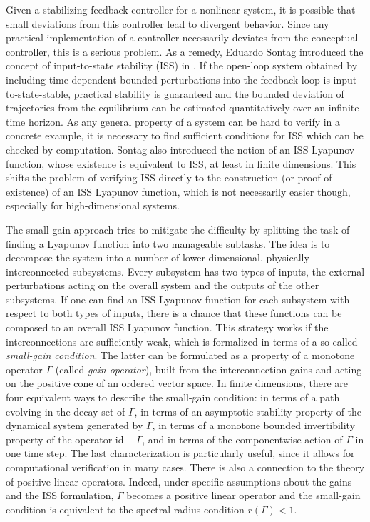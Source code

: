 \documentclass[10pt, oneside, a4paper]{article}
\newcommand{\id}{\mathrm{id}}
\begin{document}
Given a stabilizing feedback controller for a nonlinear system, it is possible that small deviations from this controller lead to divergent behavior. Since any practical implementation of a controller necessarily deviates from the conceptual controller, this is a serious problem. As a remedy, Eduardo Sontag introduced the concept of input-to-state stability (ISS) in \cite{Son}. If the open-loop system obtained by including time-dependent bounded perturbations into the feedback loop is input-to-state-stable, practical stability is guaranteed and the bounded deviation of trajectories from the equilibrium can be estimated quantitatively over an infinite time horizon. As any general property of a system can be hard to verify in a concrete example, it is necessary to find sufficient conditions for ISS which can be checked by computation. Sontag also introduced the notion of an ISS Lyapunov function, whose existence is equivalent to ISS, at least in finite dimensions. This shifts the problem of verifying ISS directly to the construction (or proof of existence) of an ISS Lyapunov function, which is not necessarily easier though, especially for high-dimensional systems.%

The small-gain approach tries to mitigate the difficulty by splitting the task of finding a Lyapunov function into two manageable subtasks. The idea is to decompose the system into a number of lower-dimensional, physically interconnected subsystems. Every subsystem has two types of inputs, the external perturbations acting on the overall system and the outputs of the other subsystems. If one can find an ISS Lyapunov function for each subsystem with respect to both types of inputs, there is a chance that these functions can be composed to an overall ISS Lyapunov function. This strategy works if the interconnections are sufficiently weak, which is formalized in terms of a so-called \emph{small-gain condition}. The latter can be formulated as a property of a monotone operator $\Gamma$ (called \emph{gain operator}), built from the interconnection gains and acting on the positive cone of an ordered vector space. In finite dimensions, there are four equivalent ways to describe the small-gain condition: in terms of a path evolving in the decay set of $\Gamma$, in terms of an asymptotic stability property of the dynamical system generated by $\Gamma$, in terms of a monotone bounded invertibility property of the operator $\id - \Gamma$, and in terms of the componentwise action of $\Gamma$ in one time step. The last characterization is particularly useful, since it allows for computational verification in many cases. There is also a connection to the theory of positive linear operators. Indeed, under specific assumptions about the gains and the ISS formulation, $\Gamma$ becomes a positive linear operator and the small-gain condition is equivalent to the spectral radius condition $r(\Gamma) < 1$.%
\end{document}
